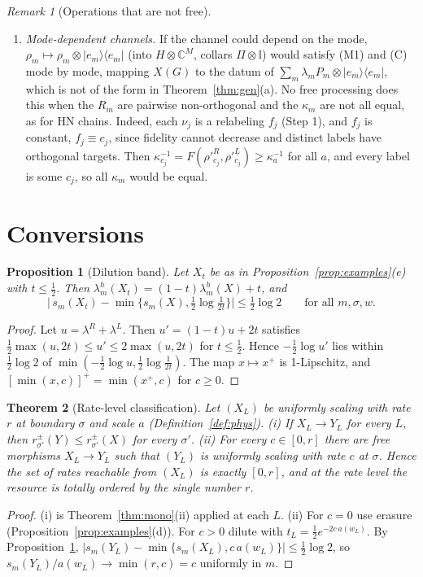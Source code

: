 \documentclass[11pt]{article}
\newtheorem{theorem}{Theorem}
\newtheorem{proposition}[theorem]{Proposition}
\theoremstyle{definition}
\theoremstyle{remark}
\newtheorem{remark}{Remark}
\newcommand{\one}{\mathbb{I}}
\newcommand{\proj}[1]{|#1\rangle\!\langle #1|}
\begin{document}
\begin{remark}[Operations that are not free]
\begin{enumerate}
\item[(d)] \emph{Mode-dependent channels.} If the channel could depend on the mode, $\rho_m\mapsto\rho_m\otimes\proj{e_m}$ (into $H\otimes\mathbb C^M$, collars $\Pi\otimes\one$) would satisfy (M1) and (C) mode by mode, mapping $X(G)$ to the datum of $\sum_m\lambda_mP_m\otimes\proj{e_m}$, which is not of the form in Theorem~\ref{thm:gen}(a). No free processing does this when the $R_m$ are pairwise non-orthogonal and the $\kappa_m$ are not all equal, as for HN chains. Indeed, each $\nu_j$ is a relabeling $f_j$ (Step 1), and $f_j$ is constant, $f_j\equiv c_j$, since fidelity cannot decrease and distinct labels have orthogonal targets. Then $\kappa_{c_j}^{-1}=F(\rho'^R_{c_j},\rho'^L_{c_j})\ge\kappa_a^{-1}$ for all $a$, and every label is some $c_j$, so all $\kappa_m$ would be equal.
\end{enumerate}
\end{remark}

\section{Conversions}
\label{sec:conv}

\begin{proposition}[Dilution band]\label{prop:dil}
Let $X_t$ be as in Proposition~\ref{prop:examples}(e) with $t\le\frac12$. Then $\lambda^h_m(X_t)=(1-t)\lambda^h_m(X)+t$, and
\[
\bigl|\,s_m(X_t)-\min\{s_m(X),\tfrac12\log\tfrac1{2t}\}\bigr|\le\tfrac12\log2\qquad\text{for all }m,\sigma,w.
\]
\end{proposition}
\begin{proof}
Let $u=\lambda^R+\lambda^L$. Then $u'=(1-t)u+2t$ satisfies $\frac12\max(u,2t)\le u'\le2\max(u,2t)$ for $t\le\frac12$. Hence $-\frac12\log u'$ lies within $\frac12\log2$ of $\min(-\frac12\log u,\frac12\log\frac1{2t})$. The map $x\mapsto x^+$ is 1-Lipschitz, and $[\min(x,c)]^+=\min(x^+,c)$ for $c\ge0$.
\end{proof}

\begin{theorem}[Rate-level classification]\label{thm:rate}
Let $(X_L)$ be uniformly scaling with rate $r$ at boundary $\sigma$ and scale $a$ (Definition~\ref{def:phys}).
(i) If $X_L\to Y_L$ for every $L$, then $r^\pm_{\sigma'}(Y)\le r^\pm_{\sigma'}(X)$ for every $\sigma'$.
(ii) For every $c\in[0,r]$ there are free morphisms $X_L\to Y_L$ such that $(Y_L)$ is uniformly scaling with rate $c$ at $\sigma$.
Hence the set of rates reachable from $(X_L)$ is exactly $[0,r]$, and at the rate level the resource is totally ordered by the single number $r$.
\end{theorem}
\begin{proof}
(i) is Theorem~\ref{thm:mono}(ii) applied at each $L$. (ii) For $c=0$ use erasure (Proposition~\ref{prop:examples}(d)). For $c>0$ dilute with $t_L=\frac12e^{-2c\,a(w_L)}$. By Proposition~\ref{prop:dil}, $|s_m(Y_L)-\min\{s_m(X_L),c\,a(w_L)\}|\le\frac12\log2$, so $s_m(Y_L)/a(w_L)\to\min(r,c)=c$ uniformly in $m$.
\end{proof}
\end{document}
